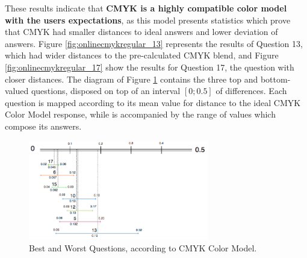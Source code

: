 %
These results indicate that \textbf{CMYK is a highly compatible color model with the users expectations}, as this model presents statistics which prove that CMYK had smaller distances to ideal answers and lower deviation of answers.
Figure \ref{fig:onlinecmykregular_13} represents the results of Question 13, which had wider distances to the pre-calculated CMYK blend, and Figure \ref{fig:onlinecmykregular_17} show the results for Question 17, the question with closer
distances. The diagram of Figure \ref{fig:cmyk_analysis} contains the three top and bottom-valued questions, disposed on top of an interval $[0 ; 0.5]$ of differences. Each question is mapped according to its mean value for
distance to the ideal CMYK Color Model response, while is accompanied by the range of values which compose its answers. \par
%
\begin{figure}[!htbp]
  \centering
  \includegraphics[width=0.7\textwidth]{images/results/cmyk_questions_analysis.png}
  \caption[Best and Worst Questions, according to CMYK Color Model.]{Best and Worst Questions, according to CMYK Color Model.}
  \label{fig:cmyk_analysis}
\end{figure}
%
%
